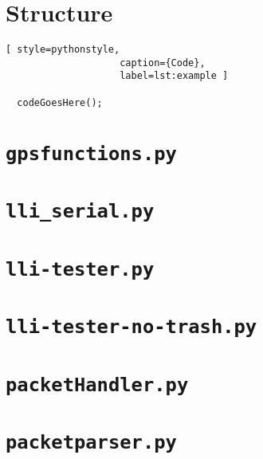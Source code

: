 \section{Structure}


\begin{lstlisting}[ style=pythonstyle,
                    caption={Code}, 
                    label=lst:example ]

  codeGoesHere();
\end{lstlisting}


\section{\lstinline[style=pythoninline,  basicstyle=\large]{gpsfunctions.py}}

\section{\lstinline[style=pythoninline,  basicstyle=\large]{lli_serial.py}}

\section{\lstinline[style=pythoninline,  basicstyle=\large]{lli-tester.py}}

\section{\lstinline[style=pythoninline,  basicstyle=\large]{lli-tester-no-trash.py}}

\section{\lstinline[style=pythoninline,  basicstyle=\large]{packetHandler.py}}

\section{\lstinline[style=pythoninline,  basicstyle=\large]{packetparser.py}}

